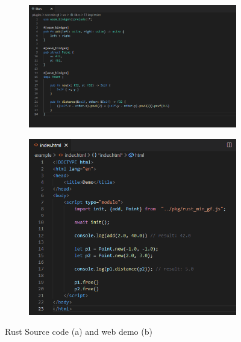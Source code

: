 \begin{figure}
  \centering
  \begin{subfigure}[b]{0.45\linewidth}
    \graphicspath{{../../assets/images/6.1.1/}}
    \centering
    \includegraphics[width=\linewidth]{8.PNG}
    \caption{}\label{fig:min-rust-plugin-code:1}
  \end{subfigure}%
  \qquad %
  \begin{subfigure}[b]{0.45\linewidth}
    \graphicspath{{../../assets/images/6.1.1/}}
    \centering
    \includegraphics[width=\linewidth]{9.PNG}
    \caption{}\label{fig:min-rust-plugin-code:2}
  \end{subfigure}%
  \caption[minimal rust geofront plugin: usage]{Rust Source code (a) and web demo (b)}
  \label{fig:min-rust-plugin-code}
\end{figure}


